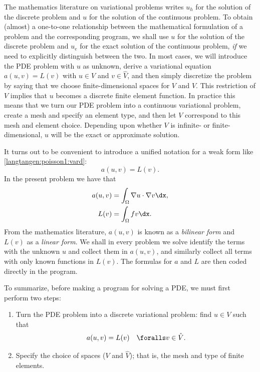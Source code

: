 The mathematics literature on variational problems writes $u_h$ for
the solution of the discrete problem and $u$ for the solution of the
continuous problem. To obtain (almost) a one-to-one relationship between
the mathematical formulation of a problem and the corresponding \fenics{}
program, we shall use $u$ for the solution of the discrete problem and
$u_{e}$ for the exact solution of the continuous problem, \emph{if}
we need to explicitly distinguish between the two.  In most cases, we
will introduce the PDE problem with $u$ as unknown, derive a variational
equation $a(u,v)=L(v)$ with $u\in V$ and $v\in \hat V$, and then simply
discretize the problem by saying that we choose finite-dimensional
spaces for $V$ and $\hat V$. This restriction of $V$ implies that $u$
becomes a discrete finite element function. In practice this means that
we turn our PDE problem into a continuous variational problem, create a
mesh and specify an element type, and then let $V$ correspond to this
mesh and element choice.  Depending upon whether $V$ is infinite- or
finite-dimensional, $u$ will be the exact or approximate solution.

It turns out to be convenient to introduce a unified notation for a weak
form like \eqref{langtangen:poisson1:vard}:
\begin{equation}
  a(u, v) = L(v).
\end{equation}
In the present problem we have that
\begin{align}
  a(u, v) &= \int_{\Omega} \nabla u \cdot \nabla v \dx,
  \label{langtangen:poisson1:vard:a}
\\
  L(v) &= \int_{\Omega} fv \dx.
\label{langtangen:poisson1:vard:L}
\end{align}
From the mathematics literature, $a(u,v)$ is known as a \emph{bilinear
form} and $L(v)$ as a \emph{linear form}.  We shall in every problem
we solve identify the terms with the unknown $u$ and collect them in
$a(u,v)$, and similarly collect all terms with only known functions
in $L(v)$. The formulas for $a$ and $L$ are then coded directly in
the program.

To summarize, before making a \fenics{} program for solving a PDE,
we must first perform two steps:
\begin{enumerate}
  \item Turn the PDE problem into a discrete variational problem: find
  $u \in V$ such that
  \begin{equation}
     a(u,v) = L(v)\quad\foralls v\in \hat{V}.
  \end{equation}

  \item Specify the choice of spaces ($V$ and $\hat V$); that is, the
  mesh and type of finite elements.
\end{enumerate}

